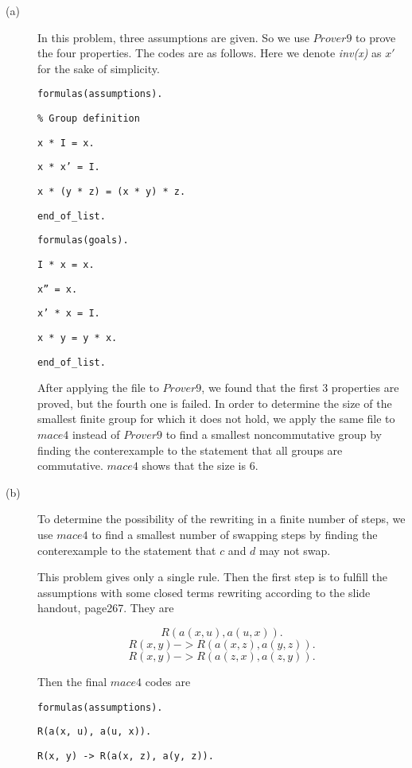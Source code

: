 \begin{description}
  \item[(a)] In this problem, three assumptions are given. So we use $Prover9$ to prove the four properties. The codes are as follows. Here we denote \emph{inv(x)} as $x'$ for the sake of simplicity.

{\footnotesize

{\tt formulas(assumptions).}

{\tt \% Group definition}

{\tt x * I = x.}

{\tt x * x' = I.}

{\tt x * (y * z) = (x * y) * z.}

{\tt end\_of\_list.}

{\tt formulas(goals).}

{\tt I * x = x.}

{\tt x'' = x.}

{\tt x' * x = I.}

{\tt x * y = y * x.}

{\tt end\_of\_list.}

}
  After applying the file to $Prover9$, we found that the first 3 properties are proved, but the fourth one is failed. In order to determine the size of the smallest finite group for which it does not hold, we apply the same file to $mace4$ instead of $Prover9$ to find a smallest noncommutative group by finding the conterexample to the statement that all groups are commutative. $mace4$ shows that the size is 6.

  \item[(b)] To determine the possibility of the rewriting in a finite number of steps, we use $mace4$ to find a smallest number of swapping steps by finding the conterexample to the statement that $c$ and $d$ may not swap.

  This problem gives only a single rule.  Then the first step is to fulfill the assumptions with some closed terms rewriting according to the slide handout, page267. They are

      \[ R(a(x, u), a(u, x)). \]
      \[ R(x, y) -> R(a(x, z), a(y, z)). \]
      \[ R(x, y) -> R(a(z, x), a(z, y)).\]

      Then the final $mace4$ codes are

{\footnotesize

{\tt formulas(assumptions).}

{\tt R(a(x, u), a(u, x)).}

{\tt R(x, y) -> R(a(x, z), a(y, z)).}

}
\end{description}
